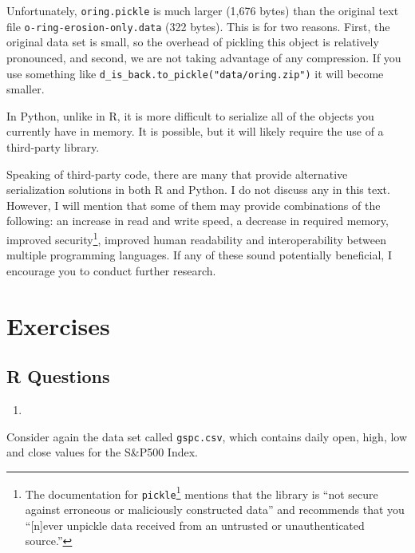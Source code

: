 \documentclass[
  12pt,
  krantz2]{krantz}
\providecommand{\tightlist}{%
  \setlength{\itemsep}{0pt}\setlength{\parskip}{0pt}}
\renewcommand{\href}[2]{#2\footnote{\url{#1}}}
\begin{document}
Unfortunately, \texttt{oring.pickle} is much larger (1,676 bytes) than the original text file \texttt{o-ring-erosion-only.data} (322 bytes). This is for two reasons. First, the original data set is small, so the overhead of pickling this object is relatively pronounced, and second, we are not taking advantage of any compression. If you use something like \texttt{d\_is\_back.to\_pickle("data/oring.zip")} it will become smaller.

In Python, unlike in R, it is more difficult to serialize all of the objects you currently have in memory. It is possible, but it will likely require the use of a third-party library.

Speaking of third-party code, there are many that provide alternative serialization solutions in both R and Python. I do not discuss any in this text. However, I will mention that some of them may provide combinations of the following: an increase in read and write speed, a decrease in required memory, improved security\footnote{The \href{https://docs.python.org/2/library/pickle.html}{documentation for \texttt{pickle}} mentions that the library is ``not secure against erroneous or maliciously constructed data'' and recommends that you ``{[}n{]}ever unpickle data received from an untrusted or unauthenticated source.''}, improved human readability and interoperability between multiple programming languages. If any of these sound potentially beneficial, I encourage you to conduct further research.

\hypertarget{exercises-7}{%
\section{Exercises}\label{exercises-7}}

\hypertarget{r-questions-7}{%
\subsection{R Questions}\label{r-questions-7}}

\begin{enumerate}
\def\labelenumi{\arabic{enumi}.}
\tightlist
\item
\end{enumerate}

Consider again the data set called \texttt{gspc.csv}, which contains daily open, high, low and close values for the S\&P500 Index.
\end{document}
